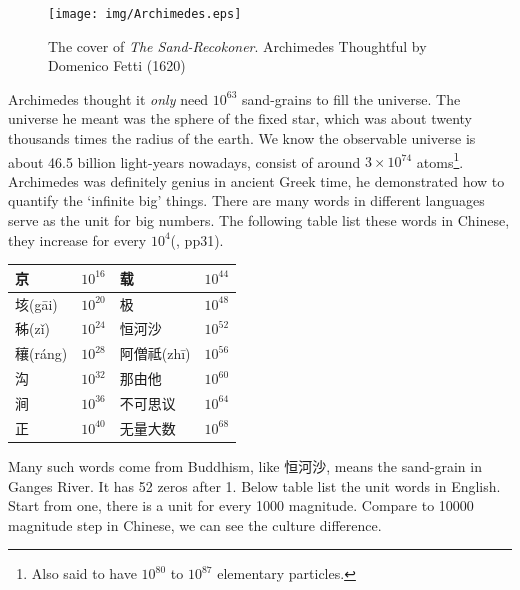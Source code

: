 \documentclass{article}
\begin{document}
\begin{figure}[htbp]
 \centering
 \texttt{[image: img/Archimedes.eps]}
 \captionsetup{labelformat=empty}
 \caption{The cover of {\em The Sand-Recokoner}. Archimedes Thoughtful by Domenico Fetti (1620)}
 \label{fig:Archimedes}
\end{figure}

Archimedes thought it {\em only} need $10^{63}$ sand-grains to fill the universe. The universe he meant was the sphere of the fixed star, which was about twenty thousands times the radius of the earth. We know the observable universe is about 46.5 billion light-years nowadays, consist of around $3 \times 10^{74}$ atoms\footnote{Also said to have $10^{80}$ to $10^{87}$ elementary particles.}. Archimedes was definitely genius in ancient Greek time, he demonstrated how to quantify the `infinite big' things. There are many words in different languages serve as the unit for big numbers. The following table list these words in Chinese, they increase for every $10^4$(\cite{Noguchi2007}, pp31).

\begin{center}
\begin{tabular}{|l|r|l|r|}
\hline
{\fontspec{\cnmainft}京}            & $10^{16}$ & {\fontspec{\cnmainft}载}            & $10^{44}$ \\
\hline
{\fontspec{\cnmainft}垓}(g\={a}i)   & $10^{20}$ & {\fontspec{\cnmainft}极}            & $10^{48}$ \\
\hline
{\fontspec{\cnmainft}秭}(z\v{i})    & $10^{24}$ & {\fontspec{\cnboldft}恒河沙}  & $10^{52}$ \\
\hline
{\fontspec{\cnmainft}穰}(r\'{a}ng)  & $10^{28}$ & {\fontspec{\cnmainft}阿僧祗}(zh\={i})  & $10^{56}$ \\
\hline
{\fontspec{\cnmainft}沟}            & $10^{32}$ & {\fontspec{\cnmainft}那由他}        & $10^{60}$ \\
\hline
{\fontspec{\cnmainft}涧}            & $10^{36}$ & {\fontspec{\cnmainft}不可思议}      & $10^{64}$ \\
\hline
{\fontspec{\cnmainft}正}            & $10^{40}$ & {\fontspec{\cnmainft}无量大数}      & $10^{68}$ \\
\hline
\end{tabular}
\end{center}

Many such words come from Buddhism, like {\fontspec{\cnmainft}恒河沙}, means the sand-grain in Ganges River. It has 52 zeros after 1. Below table list the unit words in English. Start from one, there is a unit for every 1000 magnitude. Compare to 10000 magnitude step in Chinese, we can see the culture difference.
\end{document}
